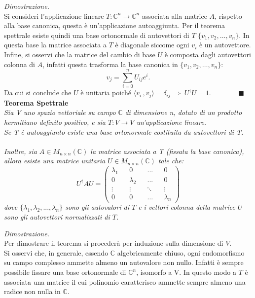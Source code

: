 \documentclass{article}
\begin{document}
\emph{\large Dimostrazione. }\normalsize\vspace{.2cm}\\
Si consideri l'applicazione lineare $T:\mathbb{C}^n\rightarrow \mathbb{C}^n$ associata alla matrice $A$, rispetto alla base canonica, questa è un'applicazione autoaggiunta. Per il teorema spettrale esiste quindi una base ortonormale di autovettori di $T$ $\{v_1,v_2,\dots,v_n\}$. In questa base la matrice associata a $T$ è diagonale siccome ogni $v_i$ è un autovettore.\\ Infine, si osservi che la matrice del cambio di base $U$ è composta dagli autovettori colonna di $A$, infatti questa trasforma la base canonica in $\{v_1,v_2,\dots,v_n\}$:
\begin{equation*}
   v_j=\sum_{i=0}^{n} U_{ij}e^i.
\end{equation*}
Da cui si conclude che $U$ è unitaria poiché $\langle v_i\,, v_j\rangle=\delta_{ij}\ \Rightarrow\ U^\dagger U=1.\qquad\qquad \blacksquare$
\newpage
\LARGE \textbf{Teorema Spettrale}\normalsize\vspace{.5cm}\\
\emph{Sia V uno spazio vettoriale su campo} $\mathbb{C}$ \emph{di dimensione n, dotato di un prodotto hermitiano definito positivo, e sia $T:V\rightarrow V$ un'applicazione lineare.\\ Se T è autoaggiunto esiste una base ortonormale costituita da autovettori di T.}\\\\
\emph{Inoltre, sia $A\in M_{n\times n}(\mathbb{C})$ la matrice associata a T (fissata la base canonica), allora esiste una matrice unitaria $U\in M_{n\times n}(\mathbb{C})$ tale che:}
\begin{equation*}
    U^{\dagger}AU=\begin{pmatrix}
        \lambda_1 && 0 && ... && 0\\
        0&&\lambda_2&&... && 0\\
        \vdots &&\vdots&&\ddots&&\vdots\\
        0&&0&&\dots&&\lambda_n
    \end{pmatrix}
\end{equation*}
\emph{dove $\{\lambda_1,\lambda_2,...,\lambda_n\}$ sono gli autovalori di $T$ e i vettori colonna della matrice $U$ sono gli autovettori normalizzati di $T$.}

\newpage
\emph{\large Dimostrazione. }\normalsize\vspace{.2cm}\\
Per dimostrare il teorema si procederà per induzione sulla dimensione di $V$.\\ Si osservi che, in generale, essendo $\mathbb{C}$ algebricamente chiuso, ogni endomorfismo su campo complesso ammette almeno un autovalore non nullo. Infatti è sempre possibile fissare una base ortonormale di $\mathbb{C} ^n$, isomorfo a V. In questo modo a $T$ è associata una matrice il cui polinomio caratterisco ammette sempre almeno una radice non nulla in $\mathbb{C} $.\\
\end{document}
